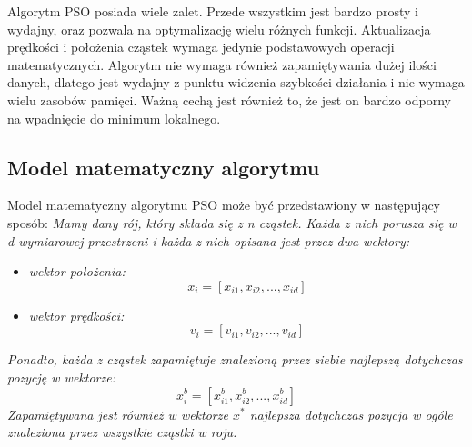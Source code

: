 Algorytm PSO posiada wiele zalet. Przede wszystkim jest bardzo prosty i wydajny, oraz pozwala na optymalizację wielu różnych funkcji. Aktualizacja prędkości i położenia cząstek wymaga jedynie podstawowych operacji matematycznych. Algorytm nie wymaga również zapamiętywania dużej ilości danych, dlatego jest wydajny z punktu widzenia szybkości działania i nie wymaga wielu zasobów pamięci. Ważną cechą jest również to, że jest on bardzo odporny na wpadnięcie do minimum lokalnego.

\subsection{Model matematyczny algorytmu}
Model matematyczny algorytmu PSO może być przedstawiony w następujący sposób:
\newline
\textit{Mamy dany rój, który składa się z n cząstek. Każda z nich porusza się w d-wymiarowej przestrzeni i każda z nich opisana jest przez dwa wektory:}

\begin{itemize}
\item\textit{wektor położenia:}
\newline
\begin{equation}
x_i = [x_{i1},x_{i2},...,x_{id}]
\end{equation}
\newline
\item\textit{wektor prędkości:}
\newline
\begin{equation}
v_i = [v_{i1},v_{i2},...,v_{id}]
\end{equation}
\newline
\end{itemize}

\textit{Ponadto, każda z cząstek zapamiętuje znalezioną przez siebie najlepszą dotychczas pozycję w wektorze:}
\newline
\begin{equation}
x_i^b=[x_{i1}^b,x_{i2}^b,...,x_{id}^b]
\end{equation} 
\newline
\textit{Zapamiętywana jest również w wektorze $x^*$ najlepsza dotychczas pozycja w ogóle znaleziona przez wszystkie cząstki w roju.}


